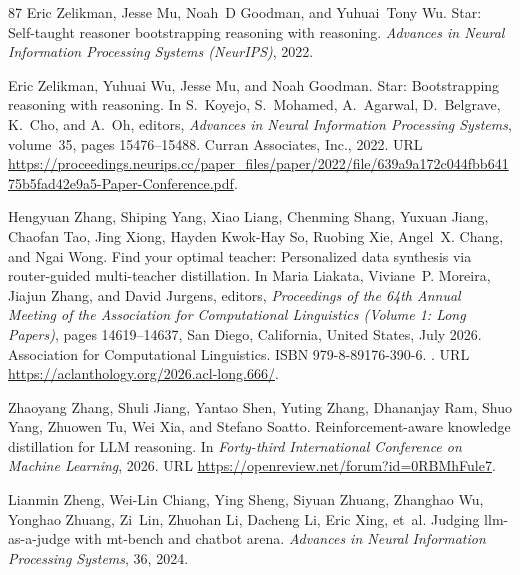 \begin{thebibliography}{87}
Eric Zelikman, Jesse Mu, Noah~D Goodman, and Yuhuai~Tony Wu.
\newblock Star: Self-taught reasoner bootstrapping reasoning with reasoning.
\newblock \emph{Advances in Neural Information Processing Systems (NeurIPS)}, 2022{}.

Eric Zelikman, Yuhuai Wu, Jesse Mu, and Noah Goodman.
\newblock Star: Bootstrapping reasoning with reasoning.
\newblock In S.~Koyejo, S.~Mohamed, A.~Agarwal, D.~Belgrave, K.~Cho, and A.~Oh, editors, \emph{Advances in Neural Information Processing Systems}, volume~35, pages 15476--15488. Curran Associates, Inc., 2022{}.
\newblock URL \url{https://proceedings.neurips.cc/paper_files/paper/2022/file/639a9a172c044fbb64175b5fad42e9a5-Paper-Conference.pdf}.

Hengyuan Zhang, Shiping Yang, Xiao Liang, Chenming Shang, Yuxuan Jiang, Chaofan Tao, Jing Xiong, Hayden Kwok-Hay So, Ruobing Xie, Angel~X. Chang, and Ngai Wong.
\newblock Find your optimal teacher: Personalized data synthesis via router-guided multi-teacher distillation.
\newblock In Maria Liakata, Viviane~P. Moreira, Jiajun Zhang, and David Jurgens, editors, \emph{Proceedings of the 64th Annual Meeting of the {A}ssociation for {C}omputational {L}inguistics (Volume 1: Long Papers)}, pages 14619--14637, San Diego, California, United States, July 2026{}. Association for Computational Linguistics.
\newblock ISBN 979-8-89176-390-6.
\newblock {}.
\newblock URL \url{https://aclanthology.org/2026.acl-long.666/}.

Zhaoyang Zhang, Shuli Jiang, Yantao Shen, Yuting Zhang, Dhananjay Ram, Shuo Yang, Zhuowen Tu, Wei Xia, and Stefano Soatto.
\newblock Reinforcement-aware knowledge distillation for {LLM} reasoning.
\newblock In \emph{Forty-third International Conference on Machine Learning}, 2026{}.
\newblock URL \url{https://openreview.net/forum?id=0RBMhFule7}.

Lianmin Zheng, Wei-Lin Chiang, Ying Sheng, Siyuan Zhuang, Zhanghao Wu, Yonghao Zhuang, Zi~Lin, Zhuohan Li, Dacheng Li, Eric Xing, et~al.
\newblock Judging llm-as-a-judge with mt-bench and chatbot arena.
\newblock \emph{Advances in Neural Information Processing Systems}, 36, 2024.


\end{thebibliography}
